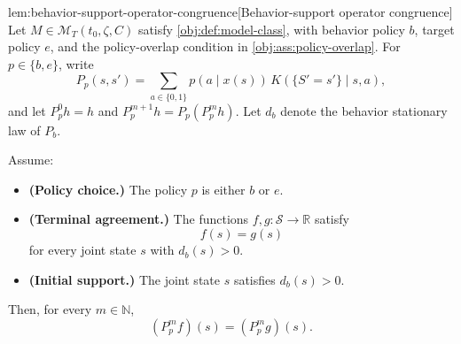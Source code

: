 \documentclass[11pt]{article}
\begin{document}
\begin{lemmav}{lem:behavior-support-operator-congruence}[Behavior-support operator congruence]
Let \(M\in\mathcal M_T(t_0,\zeta,C)\) satisfy \cref{obj:def:model-class}, with behavior policy \(b\), target policy \(e\), and the policy-overlap condition in \cref{obj:ass:policy-overlap}.  For \(p\in\{b,e\}\), write
\[
P_p(s,s')=\sum_{a\in\{0,1\}} p(a\mid x(s))\,K(\{S'=s'\}\mid s,a),
\]
and let \(P_p^0 h=h\) and \(P_p^{m+1}h=P_p(P_p^m h)\).  Let \(d_b\) denote the behavior stationary law of \(P_b\).

Assume:
\begin{itemize}
\item \textbf{(Policy choice.)} The policy \(p\) is either \(b\) or \(e\).
\item \textbf{(Terminal agreement.)} The functions \(f,g:\mathcal S\to\mathbb R\) satisfy
\[
f(s)=g(s)
\]
for every joint state \(s\) with \(d_b(s)>0\).
\item \textbf{(Initial support.)} The joint state \(s\) satisfies \(d_b(s)>0\).
\end{itemize}
Then, for every \(m\in\mathbb N\),
\[
(P_p^m f)(s)=(P_p^m g)(s).
\]
\end{lemmav}
\end{document}
